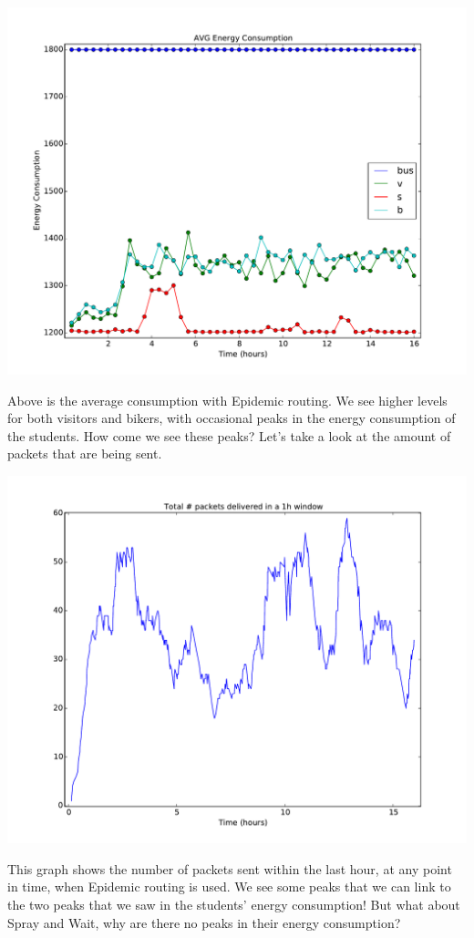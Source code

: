 \documentclass[conference]{IEEEtran}
\begin{document}
\includegraphics[scale=0.38]{../one_1.5.1-RC2/plots/Epidemic_AVG_ENERGY_CONSUMPTION.pdf}

Above is the average consumption with Epidemic routing. We see higher levels for both visitors and bikers, with occasional peaks in the energy consumption of the students. How come we see these peaks? Let's take a look at the amount of packets that are being sent.

\includegraphics[scale=0.38]{../one_1.5.1-RC2/plots/Epidemic_NUM_DELIVERED_PKTS_IN_WND.pdf}

This graph shows the number of packets sent within the last hour, at any point in time, when Epidemic routing is used. We see some peaks that we can link to the two peaks that we saw in the students' energy consumption! But what about Spray and Wait, why are there no peaks in their energy consumption?
\end{document}
